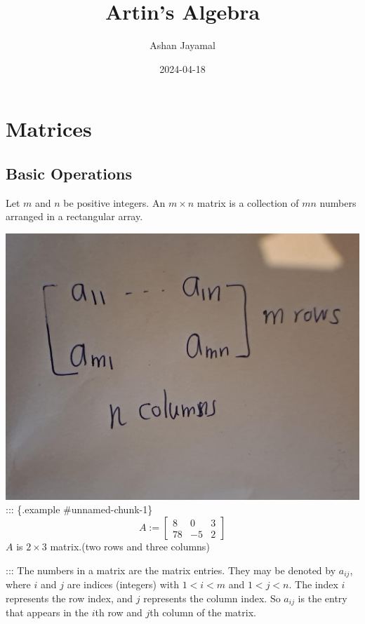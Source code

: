 \documentclass[
]{book}
\title{Artin's Algebra}
\author{Ashan Jayamal}
\date{2024-04-18}
\theoremstyle{definition}
\theoremstyle{definition}
\theoremstyle{definition}
\theoremstyle{definition}
\theoremstyle{remark}
\begin{document}
\maketitle

{
\setcounter{tocdepth}{1}
\tableofcontents
}
\hypertarget{matrices}{%
\chapter{Matrices}\label{matrices}}

\hypertarget{basic-operations}{%
\section{Basic Operations}\label{basic-operations}}

Let \(m\) and \(n\) be positive integers. An \(m \times n\) matrix is a collection of \(mn\) numbers arranged in a rectangular array.

\includegraphics{figures/ch_1/fig01.jpg}
::: \{.example \#unnamed-chunk-1\}
\[A:=\begin{bmatrix}
8 & 0 & 3\\
78 & -5 & 2
\end{bmatrix}\]
\(A\) is \(2 \times 3\) matrix.(two rows and three columns)

:::
The numbers in a matrix are the matrix entries. They may be denoted by \(a_{ij}\), where \(i\) and \(j\) are indices (integers) with \(1 < i < m\) and \(1 < j < n\). The index \(i\) represents the row index, and \(j\) represents the column index. So \(a_{ij}\) is the entry that appears in the \(i\)th row and \(j\)th column of the matrix.
\end{document}
